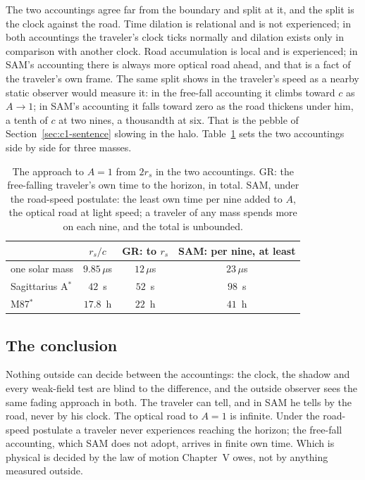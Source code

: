 The two accountings agree far from the boundary and split at it, and the split is the clock against the road. Time dilation is relational and is not experienced; in both accountings the traveler's clock ticks normally and dilation exists only in comparison with another clock. Road accumulation is local and is experienced; in SAM's accounting there is always more optical road ahead, and that is a fact of the traveler's own frame. The same split shows in the traveler's speed as a nearby static observer would measure it: in the free-fall accounting it climbs toward $c$ as $A\to1$; in SAM's accounting it falls toward zero as the road thickens under him, a tenth of $c$ at two nines, a thousandth at six. That is the pebble of Section~\ref{sec:c1-sentence} slowing in the halo. Table~\ref{tab:c1-approach} sets the two accountings side by side for three masses.

\begin{table}[t]
\centering\small
\caption{The approach to $A=1$ from $2r_s$ in the two accountings. GR: the free-falling traveler's own time to the horizon, in total. SAM, under the road-speed postulate: the least own time per nine added to $A$, the optical road at light speed; a traveler of any mass spends more on each nine, and the total is unbounded.}
\label{tab:c1-approach}
\begin{tabular}{@{}lccc@{}}
\toprule
 & $r_s/c$ & GR: to $r_s$ & SAM: per nine, at least \\
\midrule
one solar mass & $9.85\,\mu$s & $12\,\mu$s & $23\,\mu$s \\
Sagittarius A$^*$ & $42$~s & $52$~s & $98$~s \\
M87$^*$ & $17.8$~h & $22$~h & $41$~h \\
\bottomrule
\end{tabular}
\end{table}

\subsection{The conclusion}

Nothing outside can decide between the accountings: the clock, the shadow and every weak-field test are blind to the difference, and the outside observer sees the same fading approach in both. The traveler can tell, and in SAM he tells by the road, never by his clock. The optical road to $A=1$ is infinite. Under the road-speed postulate a traveler never experiences reaching the horizon; the free-fall accounting, which SAM does not adopt, arrives in finite own time. Which is physical is decided by the law of motion Chapter~V owes, not by anything measured outside.

